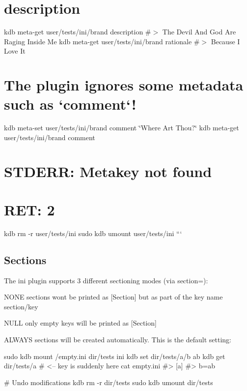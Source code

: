 \hypertarget{autotoc_md289_autotoc_md309}{}\section{description}\label{autotoc_md289_autotoc_md309}
kdb meta-\/get user/tests/ini/brand description \#$>$ The Devil And God Are Raging Inside Me kdb meta-\/get user/tests/ini/brand rationale \#$>$ Because I Love It\hypertarget{autotoc_md289_autotoc_md310}{}\section{The plugin ignores some metadata such as `comment`!}\label{autotoc_md289_autotoc_md310}
kdb meta-\/set user/tests/ini/brand comment \char`\"{}\+Where Art Thou?\char`\"{} kdb meta-\/get user/tests/ini/brand comment \hypertarget{autotoc_md289_autotoc_md311}{}\section{S\+T\+D\+E\+R\+R\+: Metakey not found}\label{autotoc_md289_autotoc_md311}
\hypertarget{autotoc_md289_autotoc_md312}{}\section{R\+E\+T\+: 2}\label{autotoc_md289_autotoc_md312}
kdb rm -\/r user/tests/ini sudo kdb umount user/tests/ini ```\hypertarget{autotoc_md289_autotoc_md313}{}\subsection{Sections}\label{autotoc_md289_autotoc_md313}
The ini plugin supports 3 different sectioning modes (via {\ttfamily section=})\+:


\begin{DoxyItemize}
\item {\ttfamily N\+O\+NE} sections wont be printed as {\ttfamily \mbox{[}Section\mbox{]}} but as part of the key name {\ttfamily section/key}
\item {\ttfamily N\+U\+LL} only empty keys will be printed as {\ttfamily \mbox{[}Section\mbox{]}}
\item {\ttfamily A\+L\+W\+A\+YS} sections will be created automatically. This is the default setting\+:
\end{DoxyItemize}


\begin{DoxyCode}
sudo kdb mount /empty.ini dir/tests ini
kdb set dir/tests/a/b ab
kdb get dir/tests/a       # <-- key is suddenly here
cat empty.ini
#> [a]
#> b=ab

# Undo modifications
kdb rm -r dir/tests
sudo kdb umount dir/tests
\end{DoxyCode}


